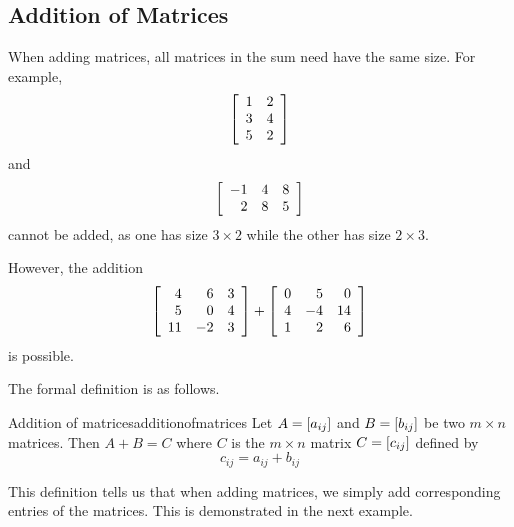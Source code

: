 \subsection{Addition of Matrices}

When adding matrices, all matrices in the sum need have the same size.
For example,
\begin{equation*}
\left[
\begin{array}{rr}
1 & 2 \\
3 & 4 \\
5 & 2
\end{array}
\right] 
\end{equation*}
and
\begin{equation*}
\left[
\begin{array}{rrr}
-1 & 4 & 8\\
2 & 8 & 5
\end{array}
\right] 
\end{equation*}
cannot be added, as one has size $3 \times 2$ while the other has size $2 \times 3$.

However, the addition
\begin{equation*}
\left[
\begin{array}{rrr}
4 & 6 & 3\\
5 & 0 & 4\\
11 & -2 & 3
\end{array}
\right] 
+
\left[
\begin{array}{rrr}
0 & 5 & 0 \\
4 & -4 & 14 \\
1 & 2 & 6
\end{array}
\right]
\end{equation*}
is possible.

The formal definition is as follows.

\begin{definition}{Addition of matrices}{additionofmatrices}
Let $A=\left[ a_{ij}\right] $ and $B=\left[ b_{ij}\right] $ be two
$m\times n$ matrices. Then $A+B=C$ where $C$ is the $m \times n$
matrix $C=\left[ c_{ij}\right]$ defined by
\begin{equation*}
c_{ij}=a_{ij}+b_{ij}
\end{equation*}

\end{definition}

This definition tells us that when adding matrices, we simply add corresponding entries of the matrices. 
This is demonstrated in the next example. 

